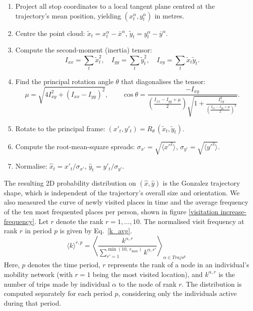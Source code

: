 \documentclass[main.tex]{subfiles}
\begin{document}
\begin{enumerate}
    \item Project all stop coordinates to a local tangent plane centred at the trajectory's mean position, yielding $(x_t^{\alpha}, y_t^{\alpha})$ in metres.
    \item Centre the point cloud: $\tilde{x}_t = x_t^{\alpha} - \bar{x}^{\alpha}$, $\tilde{y}_t = y_t^{\alpha} - \bar{y}^{\alpha}$.
    \item Compute the second-moment (inertia) tensor:
    \[
        I_{xx} = \sum_t \tilde{x}_t^2,\quad
        I_{yy} = \sum_t \tilde{y}_t^2,\quad
        I_{xy} = \sum_t \tilde{x}_t\tilde{y}_t.
    \]
    \item Find the principal rotation angle $\theta$ that diagonalises the tensor:
    \[
        \mu = \sqrt{4I_{xy}^2 + (I_{xx}-I_{yy})^2}, \qquad
        \cos\theta = \frac{-I_{xy}}{\left(\frac{I_{xx}-I_{yy}+\mu}{2}\right)
                      \sqrt{1 + \frac{I_{xy}^2}{\left(\frac{I_{xx}-I_{yy}+\mu}{2}\right)^2}}}.
    \]
    \item Rotate to the principal frame: $(x'_t, y'_t) = R_\theta\,(\tilde{x}_t, \tilde{y}_t)$.
    \item Compute the root-mean-square spreads: $\sigma_{x'} = \sqrt{\langle x'^2\rangle}$, $\sigma_{y'} = \sqrt{\langle y'^2\rangle}$.
    \item Normalise: $\hat{x}_t = x'_t/\sigma_{x'}$, $\hat{y}_t = y'_t/\sigma_{y'}$.
\end{enumerate}
%
The resulting 2D probability distribution on $(\hat{x},\hat{y})$ is the Gonzalez trajectory shape, which is independent of the trajectory's overall size and orientation.
\label{phi}
%
We also measured the curve of newly visited places in time and the average frequency of the ten most frequented places per person, shown in figure \ref{visitation increase-frequency}.
Let $r$ denote the rank $r = 1,\ldots,10$. The normalised visit frequency at rank $r$ in period $p$ is given by Eq.~\ref{k_avg}.
%
\begin{equation}
    \langle k \rangle^{r,p} =  \left\langle \frac{k^{\alpha,r}}{\sum_{r' = 1}^{\min(10,\,r_{\max})}k^{\alpha,r'}} \right\rangle_{{\alpha} \in {Trajs^p}}
    \label{k_avg}
\end{equation}
%
Here, \( p \) denotes the time period, \( r \) represents the rank of a node in an individual’s mobility network (with \( r = 1 \) being the most visited location), and \( k^{\alpha, r} \) is the number of trips made by individual \( \alpha \) to the node of rank \( r \). The distribution is computed separately for each period \( p \), considering only the individuals active during that period.
\end{document}
